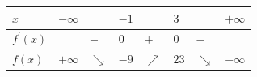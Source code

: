 \documentclass[border=.4pt]{standalone}
\begin{document}
\color{ink}\begin{tabular}{|>{\centering\arraybackslash}m{1.7cm}|>{\centering\arraybackslash}m{1.25cm}|>{\centering\arraybackslash}m{1.25cm}|>{\centering\arraybackslash}m{1.25cm}|>{\centering\arraybackslash}m{1.25cm}|>{\centering\arraybackslash}m{1.25cm}|>{\centering\arraybackslash}m{1.25cm}|>{\centering\arraybackslash}m{1.25cm}|}\hline
\cellcolor{head}$x$ & \cellcolor{head}$-\infty$ & \cellcolor{head} & \cellcolor{head}$-1$ & \cellcolor{head} & \cellcolor{head}$3$ & \cellcolor{head} & \cellcolor{head}$+\infty$ \\ \hline
\cellcolor{head}$f^{\prime}(x)$ &  & $-$ & $0$ & $+$ & $0$ & $-$ &  \\ \hline
\cellcolor{head}$f(x)$ & $+\infty$ & \color{focus}\large $\searrow$ & $-9$ & \color{focus}\large $\nearrow$ & $23$ & \color{focus}\large $\searrow$ & $-\infty$ \\ \hline\end{tabular}
\end{document}
